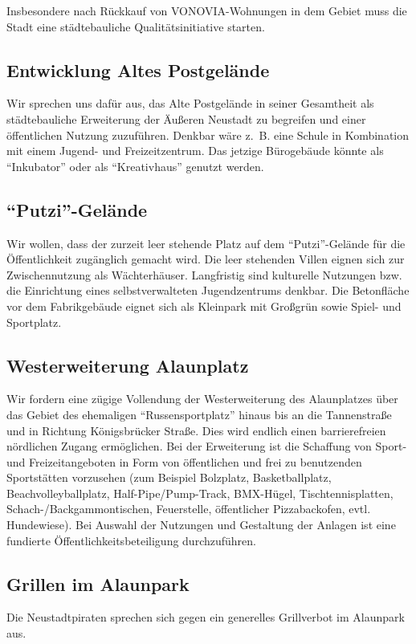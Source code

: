 \documentclass[a4paper, 11pt]{article}
\begin{document}
Insbesondere nach Rückkauf von VONOVIA-Wohnungen in dem Gebiet muss die Stadt eine städtebauliche Qualitätsinitiative starten.


\subsection{Entwicklung Altes Postgelände}
Wir sprechen uns dafür aus, das Alte Postgelände in seiner Gesamtheit als städtebauliche Erweiterung der Äußeren Neustadt zu begreifen und einer öffentlichen Nutzung zuzuführen. Denkbar wäre z. B. eine Schule in Kombination mit einem Jugend- und Freizeitzentrum. Das jetzige Bürogebäude könnte als ``Inkubator'' oder als ``Kreativhaus'' genutzt werden.


\subsection{``Putzi''-Gelände}
Wir wollen, dass der zurzeit leer stehende Platz auf dem ``Putzi''-Gelände für die Öffentlichkeit zugänglich gemacht wird. Die leer stehenden Villen eignen sich zur Zwischennutzung als Wächterhäuser. Langfristig sind kulturelle Nutzungen bzw. die Einrichtung eines selbstverwalteten Jugendzentrums denkbar. Die Betonfläche vor dem Fabrikgebäude eignet sich als Kleinpark mit Großgrün sowie Spiel- und Sportplatz.


\subsection{Westerweiterung Alaunplatz}
Wir fordern eine zügige Vollendung der Westerweiterung des Alaunplatzes über das Gebiet des ehemaligen ``Russensportplatz'' hinaus bis an die Tannenstraße und in Richtung Königsbrücker Straße. Dies wird endlich einen barrierefreien nördlichen Zugang ermöglichen. Bei der Erweiterung ist die Schaffung von Sport- und Freizeitangeboten in Form von öffentlichen und frei zu benutzenden Sportstätten vorzusehen (zum Beispiel Bolzplatz, Basketballplatz, Beachvolleyballplatz, Half-Pipe/Pump-Track, BMX-Hügel, Tischtennisplatten, Schach-/Backgammontischen, Feuerstelle, öffentlicher Pizzabackofen, evtl. Hundewiese). Bei Auswahl der Nutzungen und Gestaltung der Anlagen ist eine fundierte Öffentlichkeitsbeteiligung durchzuführen.


\subsection{Grillen im Alaunpark}
Die Neustadtpiraten sprechen sich gegen ein generelles Grillverbot im Alaunpark aus.
\end{document}
